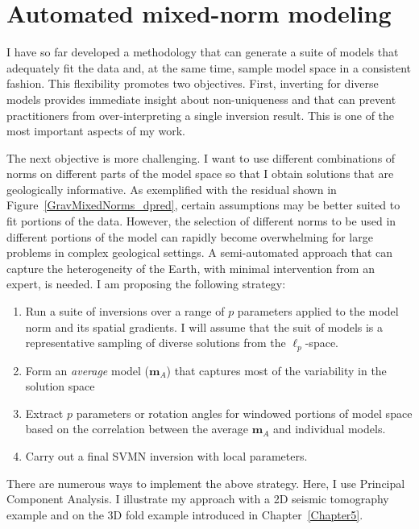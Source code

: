 \graphicspath{{./../../Figures/}}
\chapter{Automated mixed-norm modeling}
\label{Chapter6}
I have so far developed a methodology that can generate a suite of models that adequately fit the data and, at the same time, sample model space in a consistent fashion.
This flexibility promotes two objectives.
First, inverting for diverse models provides immediate insight about non-uniqueness and that can prevent practitioners from over-interpreting a single inversion result. This is one of the most important aspects of my work.

The next objective is more challenging. I want to use different combinations of norms on different parts of the model space so that I obtain solutions that are geologically informative.
As exemplified with the residual shown in Figure~\ref{GravMixedNorms_dpred}, certain assumptions may be better suited to fit portions of the data.
However, the selection of different norms to be used in different portions of the model can rapidly become overwhelming for large problems in complex geological settings. A semi-automated approach that can capture the heterogeneity of the Earth, with minimal intervention from an expert, is needed. I am proposing the following strategy:
\begin{enumerate}
\item Run a suite of inversions over a range of $p$ parameters applied to the model norm and its spatial gradients. I will assume that the suit of models is a representative sampling of diverse solutions from the $\ell_p$-space.
\item Form an \emph{average} model ($\mathbf{m}_A$) that captures most of the variability in the solution space
\item Extract $p$ parameters or rotation angles for windowed portions of model space based on the correlation between the average $\mathbf{m}_A$ and individual models.
\item Carry out a final SVMN inversion with local parameters.
\end{enumerate}
There are numerous ways to implement the above strategy. Here, I use Principal Component Analysis. I illustrate my approach with a 2D seismic tomography example and on the 3D fold example introduced in Chapter~\ref{Chapter5}.

